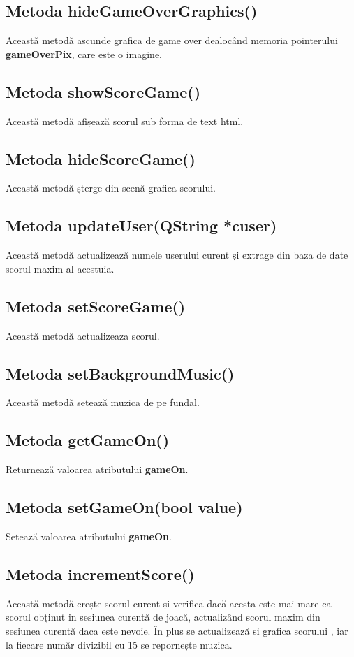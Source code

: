 \documentclass{article}
\begin{document}
\subsection{Metoda hideGameOverGraphics()}
Această metodă ascunde grafica de game over dealocând memoria pointerului
\textbf{gameOverPix}, care este o imagine.

\subsection{Metoda showScoreGame()}
Această metodă afișează scorul sub forma de text html.

\subsection{Metoda hideScoreGame()}
Această metodă șterge din scenă grafica scorului.

\subsection{Metoda updateUser(QString *cuser)}
Această metodă actualizează numele userului curent și extrage din baza de date scorul maxim al acestuia.

\subsection{Metoda setScoreGame()}
Această metodă actualizeaza scorul.

\subsection{Metoda setBackgroundMusic()}
Această metodă setează muzica de pe fundal.

\subsection{Metoda getGameOn()}
Returnează valoarea atributului \textbf{gameOn}.

\subsection{Metoda setGameOn(bool value)}
Setează valoarea atributului \textbf{gameOn}.

\subsection{Metoda incrementScore()}
Această metodă crește scorul curent și verifică dacă acesta este mai mare ca scorul obținut in sesiunea curentă de joacă, actualizând scorul maxim din sesiunea curentă daca este nevoie. În plus se actualizează si grafica scorului , iar la fiecare număr divizibil cu 15 se repornește muzica.
\end{document}
